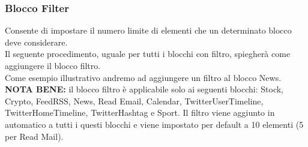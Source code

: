 \subsubsection{Blocco Filter} \label{filter}
Consente di impostare il numero limite di elementi che un determinato blocco deve considerare. \\
Il seguente procedimento, uguale per tutti i blocchi con filtro, spiegherà come aggiungere il blocco filtro. \\
Come esempio illustrativo andremo ad aggiungere un filtro al blocco News. \\
\textbf{NOTA BENE:} il blocco filtro è applicabile solo ai seguenti blocchi: Stock, Crypto, FeedRSS, News, Read Email, Calendar, TwitterUserTimeline, TwitterHomeTimeline, TwitterHashtag e Sport. Il filtro viene aggiunto in automatico a tutti i questi blocchi e viene impostato per default a 10 elementi (5 per Read Mail).
